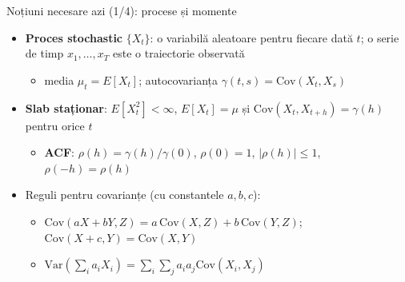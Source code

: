 \begin{frame}{Noțiuni necesare azi (1/4): procese și momente}
\itemsize{\small}
\begin{itemize}
    \item \textbf{Proces stochastic} $\{X_t\}$: o variabilă aleatoare pentru fiecare dată $t$; o serie de timp $x_1, \dots, x_T$ este o traiectorie observată
    \begin{itemize}
        \item media $\mu_t = E[X_t]$; autocovarianța $\gamma(t, s) = \mathrm{Cov}(X_t, X_s)$
    \end{itemize}
    \item \textbf{Slab staționar}: $E[X_t^2] < \infty$, $E[X_t] = \mu$ și $\mathrm{Cov}(X_t, X_{t+h}) = \gamma(h)$ pentru orice $t$
    \begin{itemize}
        \item \textbf{ACF}: $\rho(h) = \gamma(h)/\gamma(0)$, $\rho(0) = 1$, $|\rho(h)| \le 1$, $\rho(-h) = \rho(h)$
    \end{itemize}
    \item Reguli pentru covarianțe (cu constantele $a, b, c$):
    \begin{itemize}
        \item $\mathrm{Cov}(aX + bY, Z) = a\,\mathrm{Cov}(X, Z) + b\,\mathrm{Cov}(Y, Z)$; $\mathrm{Cov}(X + c, Y) = \mathrm{Cov}(X, Y)$
        \item $\mathrm{Var}(\sum_i a_iX_i) = \sum_i\sum_j a_ia_j\mathrm{Cov}(X_i, X_j)$
    \end{itemize}
\end{itemize}
\end{frame}

